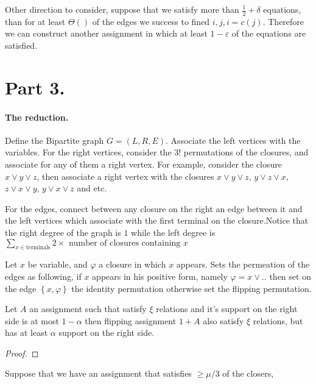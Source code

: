 \documentclass{article}
\begin{document}
Other direction to consider, suppose that we satisfy more than $\frac{1}{2} + \delta$ equations, than for at least $\Theta\left(  \right)$ of the edges we success to fined $i,j, i = c(j)$. Therefore we can construct another assignment in which at least $1 - \varepsilon$ of the equations are satisfied.     

\section{Part 3.}
\paragraph{The reduction.} Define the Bipartite graph $G = (L,R,E)$. Associate the left vertices with the variables. For the right vertices, consider the $3!$ permutations of the closures, and associate for any of them a right vertex. For example, consider the closure $ x\vee y \vee z$, then associate a right vertex with the closures $x \vee y \vee z$,  $y \vee z \vee x$, $z \vee x \vee y$, $y \vee x \vee z$ and etc.

For the edges, connect between any closure on the right an edge between it and the left vertices which associate with the first terminal on the closure.Notice that the right degree of the graph is $1$ while the left degree is $\sum_{x \in \text{terminals} }{ 2 \times \text{ number of closures containing } x}  $ 

Let $x$ be variable, and $\varphi$ a closure in which $x$ appears. Sets the permeation of the edges as following, if $x$ appears in his positive form, namely $\varphi = x \vee .. $ then set on the edge $\left\{ x, \varphi \right\}$ the identity permutation otherwise set the flipping permutation. 



\begin{claim}
  Let $A$ an assignment such that satisfy $\xi$ relations and it's support on the right side is at most $1 - \alpha$ then flipping assignment $ 1 + A$ also satisfy $\xi$ relations, but has at least $\alpha$ support on the right side.     
\end{claim}
\begin{proof}
\end{proof}

Suppose that we have an assignment that satisfies $ \ge \mu/3 $ of the closers,  
\end{document}
